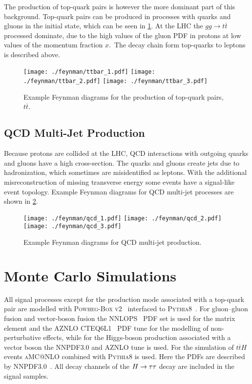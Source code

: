 The production of top-quark pairs is however the more dominant part of this background.
Top-quark pairs can be produced in processes with quarks and gluons in the initial state, which can be seen in \cref{fig:processes:ttbar}.
At the LHC the $gg \to t\overline{t}$ processed dominate, due to the high values of the gluon PDF in protons at low values of the
momentum fraction $x$.\
The decay chain form top-quarks to leptons is described above.

\begin{figure}[htb]
    \centering
    \texttt{[image: ./feynman/ttbar\_1.pdf]}
    \texttt{[image: ./feynman/ttbar\_2.pdf]}
    \texttt{[image: ./feynman/ttbar\_3.pdf]}
    \caption{Example Feynman diagrams for the production of top-quark pairs, $t\overline{t}$.}\label{fig:processes:ttbar}
\end{figure}

\subsection{QCD Multi-Jet Production}\label{sub:processes:qcd}

Because protons are collided at the LHC, QCD interactions with outgoing quarks and gluons have a high cross-section.
The quarks and gluons create jets due to hadronization, which sometimes are misidentified as leptons.
With the additional misreconstruction of missing transverse energy some events have a signal-like event topology.
Example Feynman diagrams for QCD multi-jet processes are shown in \cref{fig:processes:qcd}.

\begin{figure}[htb]
    \centering
    \texttt{[image: ./feynman/qcd\_1.pdf]}
    \texttt{[image: ./feynman/qcd\_2.pdf]}
    \texttt{[image: ./feynman/qcd\_3.pdf]}
    \caption{Example Feynman diagrams for QCD multi-jet production.}\label{fig:processes:qcd}
\end{figure}

\section{Monte Carlo Simulations}\label{sec:processes:mc}

All signal processes except for the production mode associated with a top-quark pair are modelled with
\textsc{Powheg-Box v2}~\cite{PowhegBox2} interfaced to \textsc{Pythia8}~\cite{Pythia8}.
For gluon--gluon fusion and vector-boson fusion the \textsc{NNLOPS}~\cite{NNLOPS} PDF set is used for the matrix element and the \textsc{AZNLO CTEQ6L1}~\cite{CTEQ6} PDF tune for the
modelling of non-perturbative effects, while for the Higgs-boson production associated with a vector boson the
\textsc{NNPDF3.0} and \textsc{AZNLO} tune is used.
For the simulation of $t\overline{t}H$ events \textsc{aMC@NLO} combined with \textsc{Pythia8} is used.
Here the PDFs are described by \textsc{NNPDF3.0}~\cite{NNPDF30}.
All decay channels of the $H \to \tau \tau$ decay are included in the signal samples.

